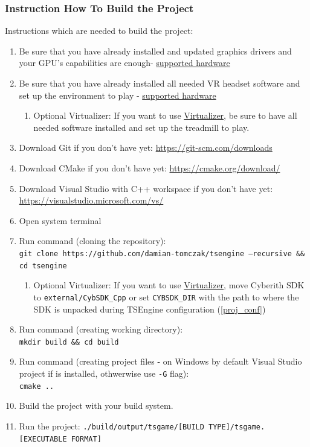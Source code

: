 \subsubsection{Instruction How To Build the Project}
\hspace{\parindent} Instructions which are needed to build the project:
\label{sec:how_to_run}
\begin{enumerate}
    \item Be sure that you have already installed and updated graphics drivers and your GPU's capabilities are enough- \hyperref[sec:hardware]{supported hardware}
    \item Be sure that you have already installed all needed VR headset software and set up the environment to play - \hyperref[sec:hardware]{supported hardware}
    \begin{enumerate}
        \item Optional Virtualizer: If you want to use \hyperref[sec:virtualizer]{Virtualizer}, be sure to have all needed software installed and set up the treadmill to play.
    \end{enumerate}
    \item Download Git if you don't have yet:
        \href{https://git-scm.com/downloads}{https://git-scm.com/downloads}
    \item Download CMake if you don't have yet:
        \href{https://cmake.org/download/}{https://cmake.org/download/}
    \item Download Visual Studio with C++ workspace if you don't have yet:
        \href{https://visualstudio.microsoft.com/vs/}{https://visualstudio.microsoft.com/vs/}
    \item Open system terminal
    \item Run command (cloning the repository):\\
        \texttt{git clone https://github.com/damian-tomczak/tsengine --recursive \&\& cd tsengine}
    \begin{enumerate}
        \item Optional Virtualizer: If you want to use \hyperref[sec:virtualizer]{Virtualizer}, move Cyberith SDK to \texttt{external/CybSDK\_Cpp} or set \texttt{CYBSDK\_DIR} with the path to where the SDK is unpacked during TSEngine configuration (\ref{proj_conf})
    \end{enumerate}
    \item Run command (creating working directory):\\
        \texttt{mkdir build \&\& cd build}
    \item Run command (creating project files - on Windows by default Visual Studio project if is installed, othwerwise use \texttt{-G} flag):\\
        \texttt{cmake ..}
    \label{proj_conf}
    \item Build the project with your build system.
    \item Run the project: \texttt{./build/output/tsgame/[BUILD TYPE]/tsgame.[EXECUTABLE FORMAT]}
\end{enumerate}

